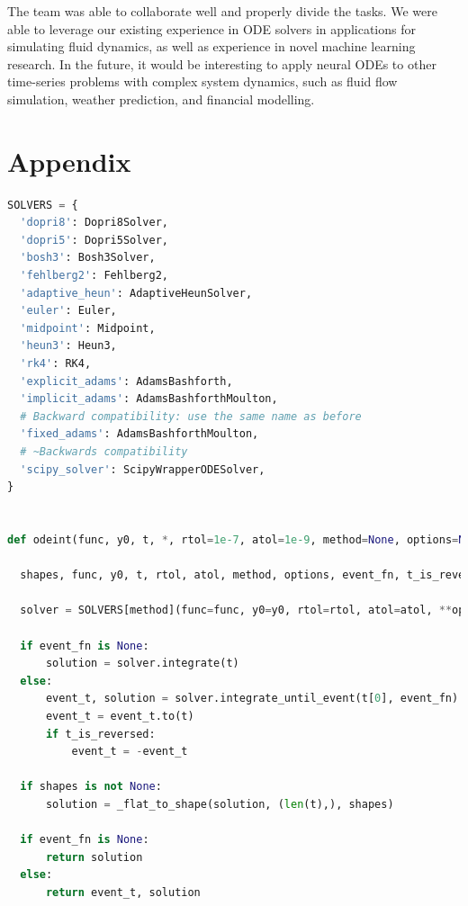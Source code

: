\documentclass[11pt]{article}
\begin{document}
The team was able to collaborate well and properly divide the tasks. We were able to leverage our existing experience in ODE solvers in applications for simulating fluid dynamics, as well as experience in novel machine learning research. In the future, it would be interesting to apply neural ODEs to other time-series problems with complex system dynamics, such as fluid flow simulation, weather prediction, and financial modelling.

\section{Appendix}
\begin{lstlisting}[language=Python,caption=Code for the ODE solver.]
SOLVERS = {
  'dopri8': Dopri8Solver,
  'dopri5': Dopri5Solver,
  'bosh3': Bosh3Solver,
  'fehlberg2': Fehlberg2,
  'adaptive_heun': AdaptiveHeunSolver,
  'euler': Euler,
  'midpoint': Midpoint,
  'heun3': Heun3,
  'rk4': RK4,
  'explicit_adams': AdamsBashforth,
  'implicit_adams': AdamsBashforthMoulton,
  # Backward compatibility: use the same name as before
  'fixed_adams': AdamsBashforthMoulton,
  # ~Backwards compatibility
  'scipy_solver': ScipyWrapperODESolver,
}


def odeint(func, y0, t, *, rtol=1e-7, atol=1e-9, method=None, options=None, event_fn=None):

  shapes, func, y0, t, rtol, atol, method, options, event_fn, t_is_reversed = _check_inputs(func, y0, t, rtol, atol, method, options, event_fn, SOLVERS)

  solver = SOLVERS[method](func=func, y0=y0, rtol=rtol, atol=atol, **options)

  if event_fn is None:
      solution = solver.integrate(t)
  else:
      event_t, solution = solver.integrate_until_event(t[0], event_fn)
      event_t = event_t.to(t)
      if t_is_reversed:
          event_t = -event_t

  if shapes is not None:
      solution = _flat_to_shape(solution, (len(t),), shapes)

  if event_fn is None:
      return solution
  else:
      return event_t, solution
\end{lstlisting}
\end{document}

